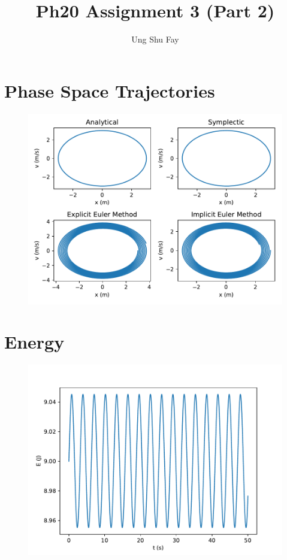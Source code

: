 \documentclass{article}
\title{Ph20 Assignment 3 (Part 2)}
\author{Ung Shu Fay}
\begin{document}
\maketitle

\section{Phase Space Trajectories}
    \begin{figure}[h!]
        \centering
        \includegraphics[scale=0.8]{phase_space.pdf}
        \label{phase}
    \end{figure}

    

\section{Energy}
    \begin{figure}[h!]
        \centering
        \includegraphics[scale=0.6]{energy.pdf}
        \label{energy}
    \end{figure}
    
\end{document}
